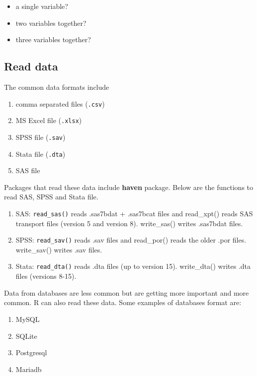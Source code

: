 \documentclass[
]{book}
\providecommand{\tightlist}{%
  \setlength{\itemsep}{0pt}\setlength{\parskip}{0pt}}
\begin{document}
\begin{itemize}
\tightlist
\item
  a single variable?
\item
  two variables together?
\item
  three variables together?
\end{itemize}

\hypertarget{read-data}{%
\subsection{Read data}\label{read-data}}

The common data formats include

\begin{enumerate}
\def\labelenumi{\arabic{enumi}.}
\tightlist
\item
  comma separated files (\texttt{.csv})
\item
  MS Excel file (\texttt{.xlsx})
\item
  SPSS file (\texttt{.sav})
\item
  Stata file (\texttt{.dta})
\item
  SAS file
\end{enumerate}

Packages that read these data include \textbf{haven} package. Below are the functions to read SAS, SPSS and Stata file.

\begin{enumerate}
\def\labelenumi{\arabic{enumi}.}
\tightlist
\item
  SAS: \texttt{read\_sas()} reads .sas7bdat + .sas7bcat files and read\_xpt() reads SAS transport files (version 5 and version 8). write\_sas() writes .sas7bdat files.
\item
  SPSS: \texttt{read\_sav()} reads .sav files and read\_por() reads the older .por files. write\_sav() writes .sav files.
\item
  Stata: \texttt{read\_dta()} reads .dta files (up to version 15). write\_dta() writes .dta files (versions 8-15).
\end{enumerate}

Data from databases are less common but are getting more important and more common. R can also read these data. Some examples of databases format are:

\begin{enumerate}
\def\labelenumi{\arabic{enumi}.}
\tightlist
\item
  MySQL
\item
  SQLite
\item
  Postgresql
\item
  Mariadb
\end{enumerate}
\end{document}
